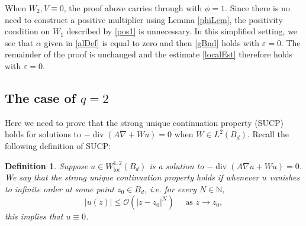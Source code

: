 \documentclass[12pt,reqno]{amsart}
\theoremstyle{plain}
\newtheorem{defn}{Definition}
\theoremstyle{definition}
\DeclareMathOperator{\di}{div}
\DeclareMathOperator{\loc}{loc}
\newcommand{\eps}{\varepsilon}
\newcommand{\al}{\alpha}
\newcommand{\gr}{\nabla}
\newcommand{\abs}[1]{\left\vert#1\right\vert}
\newcommand{\pr}[1]{\left( #1 \right) }
\newcommand{\N}{\ensuremath{\mathbb{N}}}
\begin{document}
When $W_2, V \equiv 0$, the proof above carries through with $\phi = 1$.
Since there is no need to construct a positive multiplier using Lemma \ref{phiLem}, the positivity condition on $W_1$ described by \eqref{pos1} is unnecessary.
In this simplified setting, we see that $\al$ given in \eqref{alDef} is equal to zero and then \eqref{gBnd} holds with $\eps = 0$.
The remainder of the proof is unchanged and the estimate \eqref{localEst} therefore holds with $\eps = 0$.

\subsection{The case of $q = 2$}

Here we need to prove that the strong unique continuation property (SUCP) holds for solutions to $-\di\pr{A \gr + Wu} = 0$ when $W \in L^2\pr{B_d}$.
Recall the following definition of SUCP:

\begin{defn}
Suppose $u \in W^{1,2}_{\loc}\pr{B_d}$ is a solution to $-\di\pr{A \gr u + W u} = 0$.
We say that the {\em strong unique continuation property} holds if whenever $u$ vanishes to infinite order at some point $z_0 \in B_d$, i.e. for every $N \in \N$,
$$\abs{u\pr{z}} \le \mathcal{O}\pr{\abs{z - z_0}^N} \quad \text{ as } z \to z_0,$$
this implies that $u \equiv 0$.
\end{defn}
\end{document}
